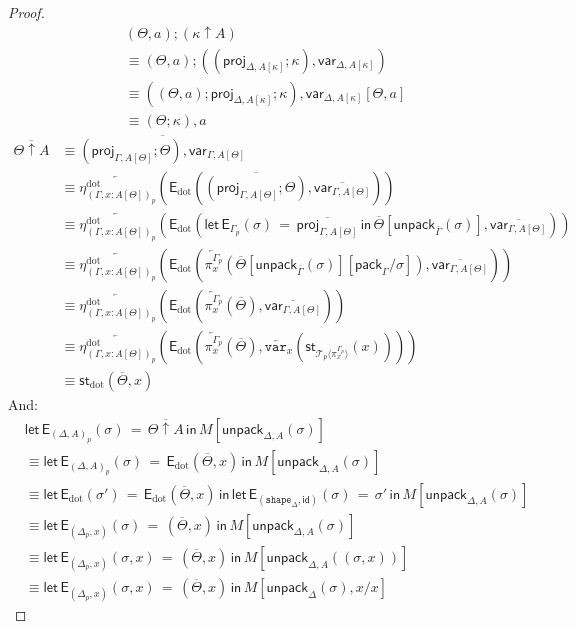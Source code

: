 \documentclass[10pt]{article}
\theoremstyle{definition}
\newcommand{\id}{\mathsf{id}}
\newcommand{\rewrite}[2]{\overleftarrow{#1}(#2)}
\newcommand\StI[2]{\ensuremath{\mathsf{st}_{#1}(#2)}}
\newcommand\EEs[4]{\ensuremath{\mathsf{let} \, \mathsf{E}_{#1}(#3) \, = \, {#2} \, \mathsf{in} \, #4}}
\newcommand\EIs[2]{\ensuremath{\mathsf{E}_{#1}{(#2)}}}
\newcommand\ApEl[2]{\mathcal{T}_{#1}\langle#2\rangle}
\newcommand\pack[1]{\ensuremath{\mathsf{pack}_{#1}}}
\newcommand\unpack[2]{\ensuremath{\mathsf{unpack}_{#1}(#2)}}
\newcommand{\modeof}[1]{{#1}_p}
\newcommand{\sdot}{\ensuremath{\mathrm{dot}}}
\newcommand{\tshape}[1]{\ensuremath{\mathtt{shape}_{#1}}}
\newcommand{\upstairs}[1]{\overline{#1}}
\newcommand\proj[1]{\ensuremath{\mathsf{proj}_{#1}}}
\newcommand\qvar[1]{\ensuremath{\mathsf{var}_{#1}}}
\newcommand\var[1]{\ensuremath{\mathtt{var}_{#1}}}
\begin{document}
\begin{proof}
\begin{align*}
&(\Theta, a);(\kappa \uparrow A) \\
&\equiv (\Theta,a);((\proj{\Delta, A[\kappa]}; \kappa) , \qvar{\Delta, A[\kappa]}) \\
&\equiv ((\Theta, a);\proj{\Delta, A[\kappa]}; \kappa) , \qvar{\Delta, A[\kappa]}[\Theta,a] \\
&\equiv (\Theta;\kappa) , a
\end{align*}
\begin{align*}
\upstairs{\Theta \uparrow A} 
&\equiv \upstairs{(\proj{\Gamma, A[\Theta]}; \Theta) , \qvar{\Gamma, A[\Theta]}} \\
&\equiv \rewrite{\eta^\sdot_{\modeof{(\Gamma, x : A[\Theta])}}}{\EIs{\sdot}{\upstairs{(\proj{\Gamma, A[\Theta]}; \Theta)}, \upstairs{\qvar{\Gamma,A[\Theta]}}}} \\
&\equiv \rewrite{\eta^\sdot_{\modeof{(\Gamma, x : A[\Theta])}}}{\EIs{\sdot}{\EEs{\modeof{\Gamma}}{\upstairs{\proj{\Gamma, A[\Theta]}}}{\sigma}{\upstairs{\Theta}[\unpack{\upstairs{\Gamma}}{\sigma}]}, \upstairs{\qvar{\Gamma,A[\Theta]}}}} \\
&\equiv \rewrite{\eta^\sdot_{\modeof{(\Gamma, x : A[\Theta])}}}{\EIs{\sdot}{\rewrite{\pi^{\modeof{\Gamma}}_x}{\upstairs{\Theta}[\unpack{\upstairs{\Gamma}}{\sigma}][\pack{\Gamma}/\sigma]}, \upstairs{\qvar{\Gamma,A[\Theta]}}}} \\
&\equiv \rewrite{\eta^\sdot_{\modeof{(\Gamma, x : A[\Theta])}}}{\EIs{\sdot}{\rewrite{\pi^{\modeof{\Gamma}}_x}{\upstairs{\Theta}}, \upstairs{\qvar{\Gamma,A[\Theta]}}}} \\
&\equiv \rewrite{\eta^\sdot_{\modeof{(\Gamma, x : A[\Theta])}}}{\EIs{\sdot}{\rewrite{\pi^{\modeof{\Gamma}}_x}{\upstairs{\Theta}},  \rewrite{\var{x}}{\StI{\ApEl{p}{\pi^{\modeof{\Gamma}}_x}}{x}}}} \\
&\equiv \StI{\sdot}{\upstairs{\Theta}, x}
\end{align*}
And:
\begin{align*}
&\EEs{\modeof{(\Delta, A)}}{\upstairs{\Theta \uparrow A}}{\sigma}{M[\unpack{\Delta, A}{\sigma}]} \\
&\equiv \EEs{\modeof{(\Delta, A)}}{\EIs{\sdot}{\upstairs{\Theta}, x}}{\sigma}{M[\unpack{\Delta, A}{\sigma}]} \\
&\equiv \EEs{\sdot}{\EIs{\sdot}{\upstairs{\Theta}, x}}{\sigma'}{\EEs{(\tshape{\Delta}, \id)}{\sigma'}{\sigma}{M[\unpack{\Delta, A}{\sigma}]}} \\
&\equiv \EEs{(\modeof{\Delta}, x)}{(\upstairs{\Theta}, x)}{\sigma}{M[\unpack{\Delta, A}{\sigma}]} \\
&\equiv \EEs{(\modeof{\Delta}, x)}{(\upstairs{\Theta}, x)}{\sigma, x}{M[\unpack{\Delta, A}{(\sigma, x)}]} \\
&\equiv \EEs{(\modeof{\Delta}, x)}{(\upstairs{\Theta}, x)}{\sigma, x}{M[\unpack{\Delta}{\sigma}, x/x]}
\end{align*}
\end{proof}
\end{document}

